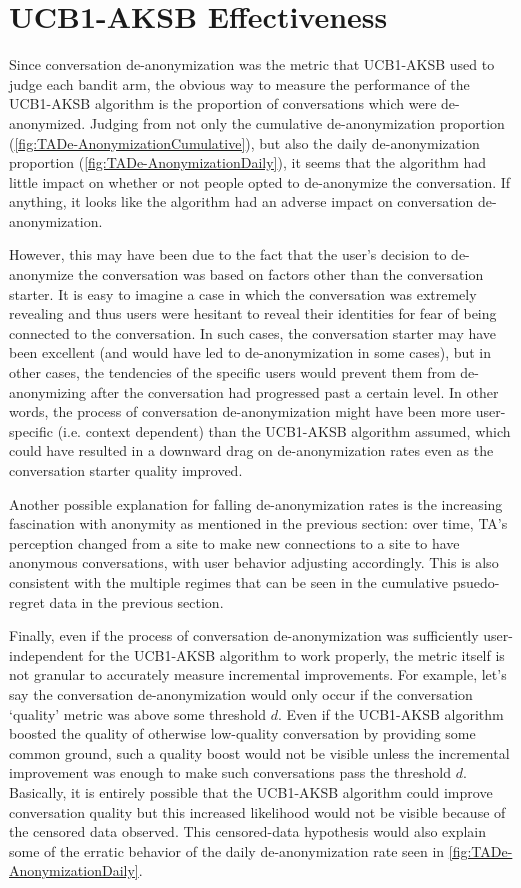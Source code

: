 \section{UCB1-AKSB Effectiveness}

Since conversation de-anonymization was the metric that UCB1-AKSB used to judge each bandit arm, the obvious way to measure the performance of the UCB1-AKSB algorithm is the proportion of conversations which were de-anonymized. Judging from not only the cumulative de-anonymization proportion (\autoref{fig:TADe-AnonymizationCumulative}), but also the daily de-anonymization proportion (\autoref{fig:TADe-AnonymizationDaily}), it seems that the algorithm had little impact on whether or not people opted to de-anonymize the conversation. If anything, it looks like the algorithm had an adverse impact on conversation de-anonymization.

However, this may have been due to the fact that the user's decision to de-anonymize the conversation was based on factors other than the conversation starter. It is easy to imagine a case in which the conversation was extremely revealing and thus users were hesitant to reveal their identities for fear of being connected to the conversation. In such cases, the conversation starter may have been excellent (and would have led to de-anonymization in some cases), but in other cases, the tendencies of the specific users would prevent them from de-anonymizing after the conversation had progressed past a certain level. In other words, the process of conversation de-anonymization might have been more user-specific (i.e. context dependent) than the UCB1-AKSB algorithm assumed, which could have resulted in a downward drag on de-anonymization rates even as the conversation starter quality improved.

Another possible explanation for falling de-anonymization rates is the increasing fascination with anonymity as mentioned in the previous section: over time, TA's perception changed from a site to make new connections to a site to have anonymous conversations, with user behavior adjusting accordingly. This is also consistent with the multiple regimes that can be seen in the cumulative psuedo-regret data in the previous section.

Finally, even if the process of conversation de-anonymization was sufficiently user-independent for the UCB1-AKSB algorithm to work properly, the metric itself is not granular to accurately measure incremental improvements. For example, let's say the conversation de-anonymization would only occur if the conversation `quality' metric was above some threshold $d$. Even if the UCB1-AKSB algorithm boosted the quality of otherwise low-quality conversation by providing some common ground, such a quality boost would not be visible unless the incremental improvement was enough to make such conversations pass the threshold $d$. Basically, it is entirely possible that the UCB1-AKSB algorithm could improve conversation quality but this increased likelihood would not be visible because of the censored data observed. This censored-data hypothesis would also explain some of the erratic behavior of the daily de-anonymization rate seen in \autoref{fig:TADe-AnonymizationDaily}.

